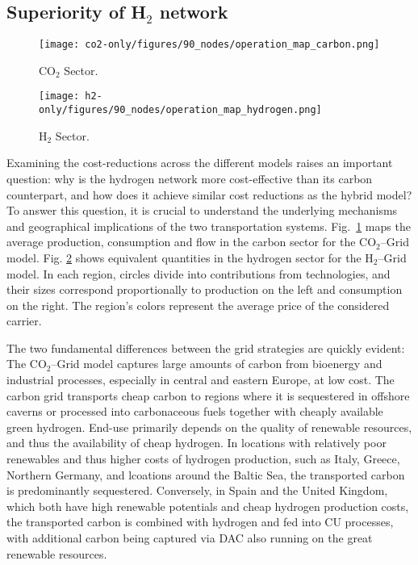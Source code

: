\documentclass[twocolumn]{article}
\newcommand{\carbon}{CO$_2$}
\newcommand{\hydrogen}{H$_2$}
\newcommand{\carbongrid}{\carbon{}--Grid}
\newcommand{\hydrogengrid}{\hydrogen{}--Grid}
\begin{document}
\subsection*{Superiority of \hydrogen{} network}

\begin{figure*}[ht!]
    \centering
    \begin{subfigure}{0.9\linewidth}
        \centering
        \texttt{[image: co2-only/figures/90\_nodes/operation\_map\_carbon.png]}
        \caption{\carbon{} Sector.}
        \label{fig:operation_map_carbon}
    \end{subfigure}
    \begin{subfigure}{0.9\linewidth}
        \centering
        \texttt{[image: h2-only/figures/90\_nodes/operation\_map\_hydrogen.png]}
        \caption{\hydrogen{} Sector.}
        \label{fig:operation_map_hydrogen}
    \end{subfigure}
    \caption{Optimal operation per sector for a net-zero energy system in Europe with average production on the left and average consumption on the right for both, (a) the \carbon{} sector in the \carbon{}-Grid model and (b) the \hydrogen{} sector in the \hydrogen-Grid model.}
    \label{fig:operation_map}
\end{figure*}


Examining the cost-reductions across the different models raises an important question: why is the hydrogen network more cost-effective than its carbon counterpart, and how does it achieve similar cost reductions as the hybrid model? To answer this question, it is crucial to understand the underlying mechanisms and geographical implications of the two transportation systems. Fig.~\ref{fig:operation_map_carbon} maps the average production, consumption and flow in the carbon sector for the \carbongrid{} model. Fig. \ref{fig:operation_map_hydrogen} shows equivalent quantities in the hydrogen sector for the \hydrogengrid{} model. In each region, circles divide into contributions from technologies, and their sizes correspond proportionally to production on the left and consumption on the right. The region's colors represent the average price of the considered carrier.

The two fundamental differences between the grid strategies are quickly evident: The \carbongrid{} model captures large amounts of carbon from bioenergy and industrial processes, especially in central and eastern Europe, at low cost. The carbon grid transports cheap carbon to regions where it is sequestered in offshore caverns or processed into carbonaceous fuels together with cheaply available green hydrogen. End-use primarily depends on the quality of renewable resources, and thus the availability of cheap hydrogen. In locations with relatively poor renewables and thus higher costs of hydrogen production, such as Italy, Greece, Northern Germany, and lcoations around the Baltic Sea, the transported carbon is predominantly sequestered. Conversely, in Spain and the United Kingdom, which both have high renewable potentials and cheap hydrogen production costs, the transported carbon is combined with hydrogen and fed into CU processes, with additional carbon being captured via DAC also running on the great renewable resources.
\end{document}
